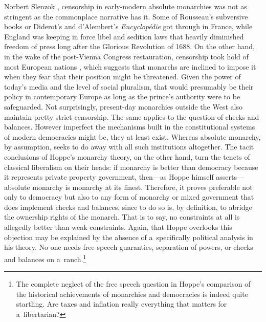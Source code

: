 \begin{artengenv}{Norbert Slenzok}
{%
\parencite*[][pp.114–117]{henshall_myth_2013}, %
 censorship in early-modern absolute monarchies was not as stringent as the commonplace narrative has it. Some of Rousseau's subversive books or Diderot's and d'Alembert's \textit{Encyclopédie} got through in France, while England was keeping in force libel and sedition laws that heavily diminished freedom of press long after the Glorious Revolution of 1688. On the other hand, in the wake of the post-Vienna Congress restauration, censorship took hold of most European nations 
\parencite[][p.208]{henshall_myth_2013}, %
 which suggests that monarchs are inclined to impose it when they fear that their position might be threatened. Given the power of today's media and the level of social pluralism, that would presumably be their policy in contemporary Europe as long as the prince's authority were to be safeguarded. Not surprisingly, present-day monarchies outside the West also maintain pretty strict censorship. } The same applies to the question of checks and balances. However imperfect the mechanisms built in the constitutional systems of modern democracies might be, they at least exist. Whereas absolute monarchy, by assumption, seeks to do away with all such institutions altogether. The tacit conclusions of Hoppe's monarchy theory, on the other hand, turn the tenets of classical liberalism on their heads: if monarchy is better than democracy because it represents private property government, then---as Hoppe 
\parencite*[][f.9]{hoppe_democracy_2007} %
 himself asserts--- absolute monarchy is monarchy at its finest. Therefore, it proves preferable not only to democracy but also to any form of monarchy or mixed government that does implement checks and balances, since to do so is, by definition, to abridge the ownership rights of the monarch. That is to say, no constraints at all is allegedly better than weak constraints. Again, that Hoppe overlooks this objection may be explained by the absence of a~specifically political analysis in his theory. No one needs free speech guaranties, separation of powers, or checks and balances on a~ranch.\footnote{The complete neglect of the free speech question in Hoppe's 
\parencite*[][pp.50–62]{hoppe_democracy_2007} %
 comparison of the historical achievements of monarchies and democracies is indeed quite startling. Are taxes and inflation really everything that matters for a~libertarian? }




\end{artengenv}
